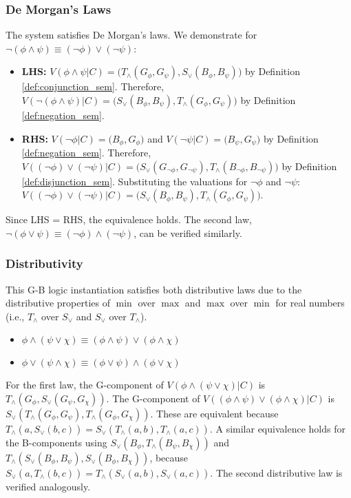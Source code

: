 \documentclass[11pt]{article}
\newcommand{\GB}[2]{\bigl(#1,#2\bigr)} %
\theoremstyle{remark}
\begin{document}
\subsubsection{De Morgan’s Laws}
The system satisfies De Morgan's laws. We demonstrate for $\neg (\phi \land \psi) \equiv (\neg \phi) \lor (\neg \psi)$:
\begin{itemize}
    \item \textbf{LHS:} $V(\phi \land \psi|C) = \GB{T_\wedge(G_\phi, G_\psi)}{S_\vee(B_\phi, B_\psi)}$ by Definition \ref{def:conjunction_sem}.
    Therefore, $V(\neg(\phi \land \psi)|C) = \GB{S_\vee(B_\phi, B_\psi)}{T_\wedge(G_\phi, G_\psi)}$ by Definition \ref{def:negation_sem}.
    \item \textbf{RHS:} $V(\neg\phi|C) = \GB{B_\phi}{G_\phi}$ and $V(\neg\psi|C) = \GB{B_\psi}{G_\psi}$ by Definition \ref{def:negation_sem}.
    Therefore, $V((\neg\phi) \lor (\neg\psi)|C) = \GB{S_\vee(G_{\neg\phi}, G_{\neg\psi})}{T_\wedge(B_{\neg\phi}, B_{\neg\psi})}$ by Definition \ref{def:disjunction_sem}.
    Substituting the valuations for $\neg\phi$ and $\neg\psi$: $V((\neg\phi) \lor (\neg\psi)|C) = \GB{S_\vee(B_\phi, B_\psi)}{T_\wedge(G_\phi, G_\psi)}$.
\end{itemize}
Since LHS = RHS, the equivalence holds. The second law, $\neg (\phi \lor \psi) \equiv (\neg \phi) \land (\neg \psi)$, can be verified similarly.

\subsubsection{Distributivity}
This G-B logic instantiation satisfies both distributive laws due to the distributive properties of $\min$ over $\max$ and $\max$ over $\min$ for real numbers (i.e., $T_\wedge$ over $S_\vee$ and $S_\vee$ over $T_\wedge$).
\begin{itemize}
    \item $\phi \land (\psi \lor \chi) \equiv (\phi \land \psi) \lor (\phi \land \chi)$
    \item $\phi \lor (\psi \land \chi) \equiv (\phi \lor \psi) \land (\phi \lor \chi)$
\end{itemize}
For the first law, the G-component of $V(\phi \land (\psi \lor \chi)|C)$ is $T_\wedge(G_\phi, S_\vee(G_\psi, G_\chi))$. The G-component of $V((\phi \land \psi) \lor (\phi \land \chi)|C)$ is $S_\vee(T_\wedge(G_\phi, G_\psi), T_\wedge(G_\phi, G_\chi))$. These are equivalent because $T_\wedge(a, S_\vee(b,c)) = S_\vee(T_\wedge(a,b), T_\wedge(a,c))$. A similar equivalence holds for the B-components using $S_\vee(B_\phi, T_\wedge(B_\psi, B_\chi))$ and $T_\wedge(S_\vee(B_\phi, B_\psi), S_\vee(B_\phi, B_\chi))$, because $S_\vee(a, T_\wedge(b,c)) = T_\wedge(S_\vee(a,b), S_\vee(a,c))$. The second distributive law is verified analogously.
\end{document}
